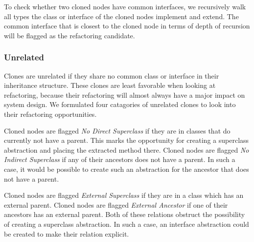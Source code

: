 To check whether two cloned nodes have common interfaces, we recursively walk all types the class or interface of the cloned nodes implement and extend. The common interface that is closest to the cloned node in terms of depth of recursion will be flagged as the refactoring candidate.

\subsubsection{Unrelated}
Clones are unrelated if they share no common class or interface in their inheritance structure. These clones are least favorable when looking at refactoring, because their refactoring will almost always have a major impact on system design. We formulated four catagories of unrelated clones to look into their refactoring opportunities.

Cloned nodes are flagged \textit{No Direct Superclass} if they are in classes that do currently not have a parent. This marks the opportunity for creating a superclass abstraction and placing the extracted method there. Cloned nodes are flagged \textit{No Indirect Superclass} if any of their ancestors does not have a parent. In such a case, it would be possible to create such an abstraction for the ancestor that does not have a parent.

Cloned nodes are flagged \textit{External Superclass} if they are in a class which has an external parent. Cloned nodes are flagged \textit{External Ancestor} if one of their ancestors has an external parent. Both of these relations obstruct the possibility of creating a superclass abstraction. In such a case, an interface abstraction could be created to make their relation explicit.

